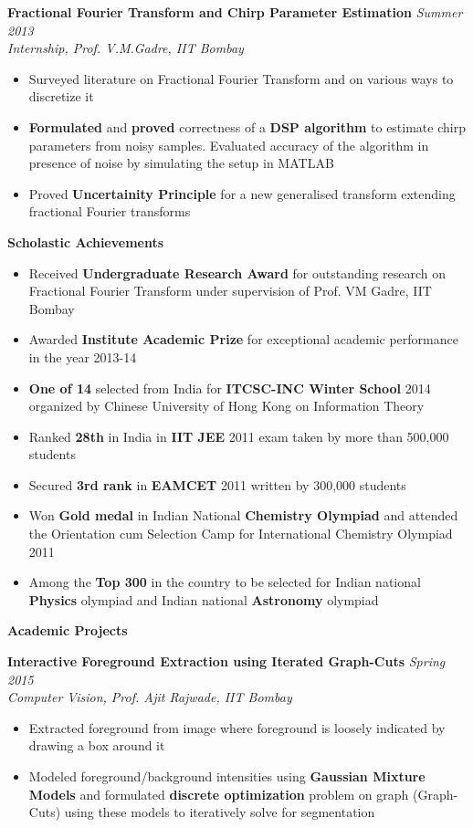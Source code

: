 \documentclass[a4paper,10pt]{article}
\newcommand{\resheading}[1]{
	{\large \colorbox{mygrey}{\begin{minipage}{\textwidth}{\textbf{#1 \vphantom{p\^{E}}}}\end{minipage}}}
}
\newcommand{\ressubheadingWithGuide}[3]{%

	\textbf{#1} \hfill \textit{#2}\null\\
	\textit{\small #3} %
	\vspace{-4pt}
}
\begin{document}
	\ressubheadingWithGuide{Fractional Fourier Transform and Chirp Parameter Estimation}{Summer 2013}{Internship, Prof. V.M.Gadre, IIT Bombay}
	  	\begin{itemize}\itemsep -1pt
	    	\item Surveyed literature on Fractional Fourier Transform and on various ways to discretize it
	        \item \textbf{Formulated} and \textbf{proved} correctness of a \textbf{DSP algorithm} to estimate chirp parameters from noisy samples. Evaluated accuracy of the algorithm in presence of noise by simulating the setup in MATLAB
			\item Proved \textbf{Uncertainity Principle} for a new generalised transform extending fractional Fourier transforms
		\end{itemize}

\resheading{Scholastic Achievements} 
	\begin{itemize}\itemsep -1pt
	    	\item Received \textbf{Undergraduate Research Award} for outstanding research on Fractional Fourier Transform under supervision of Prof. VM Gadre, IIT Bombay
			\item Awarded \textbf{Institute Academic Prize} for exceptional academic performance in the year 2013-14
			\item \textbf{One of 14} selected from India for \textbf{ITCSC-INC Winter School} 2014 organized by Chinese University of Hong Kong on Information Theory
			\item Ranked \textbf{28th} in India in \textbf{IIT JEE} 2011 exam taken by more than 500,000 students
			\item Secured \textbf{3rd rank} in \textbf{EAMCET} 2011 written by 300,000 students
			\item Won \textbf{Gold medal} in Indian National \textbf{Chemistry Olympiad} and attended the Orientation cum Selection Camp for International Chemistry Olympiad 2011
			\item Among the \textbf{Top 300} in the country to be selected for Indian national \textbf{Physics} olympiad and Indian national \textbf{Astronomy} olympiad 
    \end{itemize}				
	
\resheading{Academic Projects}
	\ressubheadingWithGuide{Interactive Foreground Extraction using Iterated Graph-Cuts}{Spring 2015}{Computer Vision, Prof. Ajit Rajwade, IIT Bombay}
			\begin{itemize} \itemsep -1pt
				\item Extracted foreground from image where foreground is loosely indicated by drawing a box around it
				\item Modeled foreground/background intensities using \textbf{Gaussian Mixture Models} and formulated \textbf{discrete optimization} problem on graph (Graph-Cuts) using these models to iteratively solve for segmentation
			\end{itemize}
\end{document}
